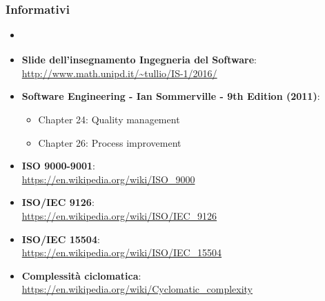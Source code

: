 \subsubsection{Informativi}
\begin{itemize}
	\item \textbf{\PianoDiProgetto{}}
	\item \textbf{Slide dell'insegnamento Ingegneria del Software}:\\
	\url{http://www.math.unipd.it/~tullio/IS-1/2016/}
	\item \textbf{Software Engineering - Ian Sommerville - 9th Edition (2011)}:
	\begin{itemize}
		\item Chapter 24: Quality management
		\item Chapter 26: Process improvement
	\end{itemize}
	\item \textbf{ISO 9000-9001}:\\
	\url{https://en.wikipedia.org/wiki/ISO_9000}
	\item \textbf{ISO/IEC 9126}:\\
	\url{https://en.wikipedia.org/wiki/ISO/IEC_9126}
	\item  \textbf{ISO/IEC 15504}:\\
	\url{https://en.wikipedia.org/wiki/ISO/IEC_15504}
	\item \textbf{Complessità ciclomatica}:\\
	\url{https://en.wikipedia.org/wiki/Cyclomatic_complexity}
	
	
\end{itemize}